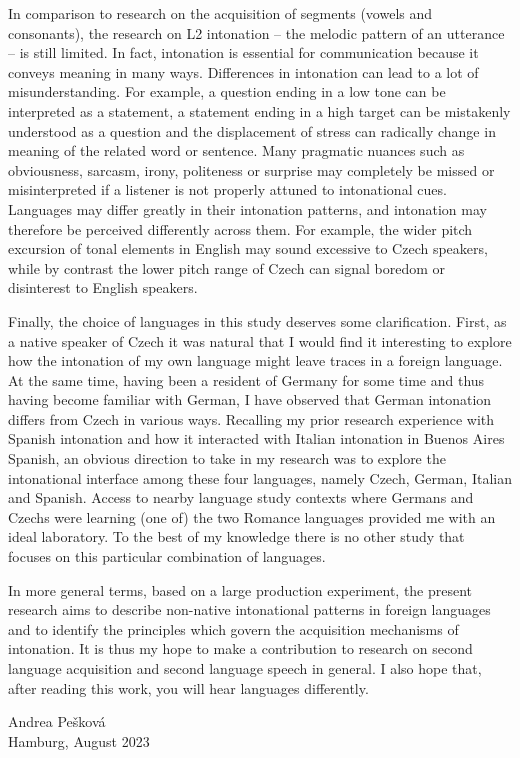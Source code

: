 In comparison to research on the acquisition of segments (vowels and consonants), the research on L2 intonation -- the melodic pattern of an utterance -- is still limited. In fact, intonation is essential for communication because it conveys meaning in many ways. Differences in intonation can lead to a lot of misunderstanding. For example, a question ending in a low tone can be interpreted as a statement, a statement ending in a high target can be mistakenly understood as a question and the displacement of stress can radically change in meaning of the related word or sentence. Many pragmatic nuances such as obviousness, sarcasm, irony, politeness or surprise may completely be missed or misinterpreted if a listener is not properly attuned to intonational cues. Languages may differ greatly in their intonation patterns, and intonation may therefore be perceived differently across them. For example, the wider pitch excursion of tonal elements in English may sound excessive to Czech speakers, while by contrast the lower pitch range of Czech can signal boredom or disinterest to English speakers.



Finally, the choice of languages in this study deserves some clarification. First, as a native speaker of Czech it was natural that I would find it interesting to explore how the intonation of my own language might leave traces in a foreign language. At the same time, having been a resident of Germany for some time and thus having become familiar with German, I have observed that German intonation differs from Czech in various ways. Recalling my prior research experience with Spanish intonation and how it interacted with Italian intonation in Buenos Aires Spanish, an obvious direction to take in my research was to explore the intonational interface among these four languages, namely Czech, German, Italian and Spanish. Access to nearby language study contexts where Germans and Czechs were learning (one of) the two Romance languages provided me with an ideal laboratory. To the best of my knowledge there is no other study that focuses on this particular combination of languages.



In more general terms, based on a large production experiment, the present research aims to describe non-native intonational patterns in foreign languages and to identify the principles which govern the acquisition mechanisms of intonation. It is thus my hope to make a contribution to research on second language acquisition and second language speech in general. I also hope that, after reading this work, you will hear languages differently.


\bigskip
\hfill Andrea Pešková\\
\hbox{}\hfill Hamburg, August 2023\hbox{}
